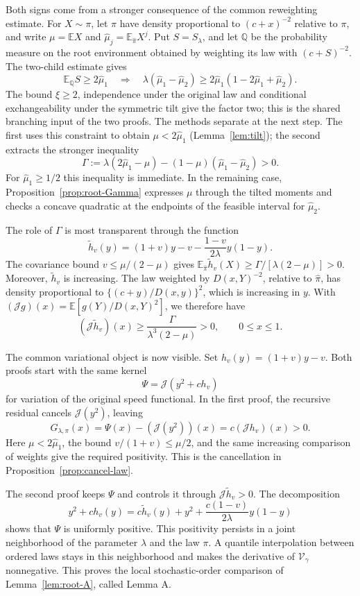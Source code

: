 \documentclass[11pt,reqno]{amsart}
\theoremstyle{plain}
\theoremstyle{definition}
\theoremstyle{remark}
\numberwithin{equation}{section}
\newcommand{\E}{\mathbb E}
\newcommand{\cJ}{\mathcal J}
\begin{document}
Both signs come from a stronger consequence of the common reweighting
estimate. For $X\sim\pi$, let $\widehat\pi$ have density proportional
to $(c+x)^{-2}$ relative to $\pi$, and write
$\mu=\E X$ and $\widehat\mu_j=\E_{\widehat\pi}X^j$. Put
$S=S_\lambda$, and let $\mathbb Q$ be the probability measure on the
root environment obtained by weighting its law with $(c+S)^{-2}$.
The two-child estimate gives
\[
 \E_{\mathbb Q}S\ge2\widehat\mu_1
 \quad\Longrightarrow\quad
 \lambda(\widehat\mu_1-\widehat\mu_2)
 \ge2\widehat\mu_1(1-2\widehat\mu_1+\widehat\mu_2).
\]
The bound $\xi\ge2$, independence under the original law and conditional
exchangeability under the symmetric tilt give the factor two; this is the shared
branching input of the two proofs. The methods separate at the next
step. The first uses this constraint to obtain
$\mu<2\widehat\mu_1$ (Lemma~\ref{lem:tilt}); the second extracts the
stronger inequality
\[
 \Gamma:=\lambda(2\widehat\mu_1-\mu)
       -(1-\mu)(\widehat\mu_1-\widehat\mu_2)>0.
\]
For $\widehat\mu_1\ge1/2$ this inequality is immediate. In the remaining
case, Proposition~\ref{prop:root-Gamma} expresses $\mu$ through the
tilted moments and checks a concave quadratic at the endpoints of the
feasible interval for $\widehat\mu_2$.

The role of $\Gamma$ is most transparent through the function
\[
 \widetilde h_v(y)
 =(1+v)y-v-\frac{1-v}{2\lambda}y(1-y).
\]
The covariance bound $v\le\mu/(2-\mu)$ gives
$\E_{\widehat\pi}\widetilde h_v(X)
\ge\Gamma/[\lambda(2-\mu)]>0$.
Moreover, $\widetilde h_v$ is increasing. The law weighted by
$D(x,Y)^{-2}$, relative to $\widehat\pi$, has density proportional
to $\{(c+y)/D(x,y)\}^2$, which is increasing in $y$.
With $(\cJ g)(x)=\E[g(Y)/D(x,Y)^2]$, we therefore have
\[
 (\cJ\widetilde h_v)(x)
 \ge\frac{\Gamma}{\lambda^3(2-\mu)}>0,
 \qquad 0\le x\le1.
\]

The common variational object is now visible. Set
$h_v(y)=(1+v)y-v$. Both proofs start with the same kernel
\[
 \Psi=\cJ(y^2+c h_v)
\]
for variation of the original speed functional. In the first proof,
the recursive residual cancels $\cJ(y^2)$, leaving
\[
 G_{\lambda,\pi}(x)
 =\Psi(x)-(\cJ(y^2))(x)
 =c(\cJ h_v)(x)>0.
\]
Here $\mu<2\widehat\mu_1$, the bound
$v/(1+v)\le\mu/2$, and the same increasing comparison of weights
give the required positivity. This is the cancellation in
Proposition~\ref{prop:cancel-law}.

The second proof keeps $\Psi$ and controls it through
$\cJ\widetilde h_v>0$. The decomposition
\[
 y^2+c h_v(y)
 =c\widetilde h_v(y)+y^2+
       \frac{c(1-v)}{2\lambda}y(1-y)
\]
shows that $\Psi$ is uniformly positive. This positivity persists in
a joint neighborhood of the parameter $\lambda$ and the law $\pi$.
A quantile interpolation between ordered laws stays in this
neighborhood and makes the derivative of $\mathcal V_\gamma$
nonnegative. This proves the local
stochastic-order comparison of Lemma~\ref{lem:root-A}, called Lemma A.
\end{document}
